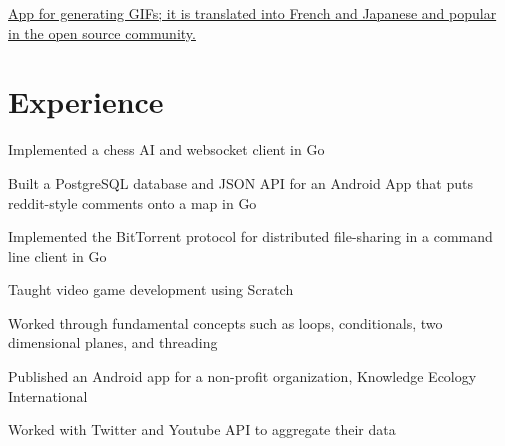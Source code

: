 \documentclass[]{deedy-resume-openfont}
\begin{document}
\href{https://github.com/polypmer/fissure-android}{App for generating GIFs; it is translated into French and Japanese and popular in the open source community.}
\sectionsep



\section{Experience}
\begin{tightemize}
\item Implemented a chess AI and websocket client in Go
\item Built a PostgreSQL database and JSON API for an Android App that puts reddit-style comments onto a map in Go
\item Implemented the BitTorrent protocol for distributed file-sharing in a command line client in Go
\end{tightemize}
\sectionsep

\begin{tightemize}
\item Taught video game development using Scratch
\item Worked through fundamental concepts such as loops, conditionals, two dimensional planes, and threading
\end{tightemize}
\sectionsep

\begin{tightemize}
\item Published an Android app for a non-profit organization, Knowledge Ecology International
\item Worked with Twitter and Youtube API to aggregate their data
\end{tightemize}
\sectionsep
\end{document}
